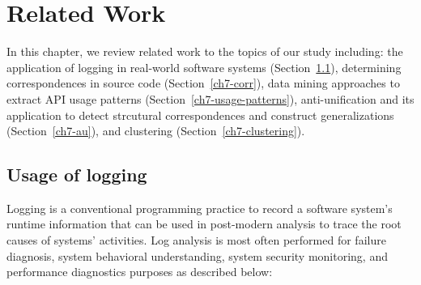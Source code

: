 \chapter{Related Work}  \label{rw}
In this chapter, we review related work to the topics of our study including: the application of logging in real-world software systems (Section~\ref{logging}), determining correspondences in source code (Section~\ref{ch7-corr}), data mining approaches to extract API usage patterns (Section~\ref{ch7-usage-patterns}), anti-unification and its application to detect strcutural correspondences and construct generalizations (Section~\ref{ch7-au}), and clustering (Section~\ref{ch7-clustering}).
\section{Usage of logging}  \label{logging}
Logging is a conventional programming practice to record a software system's runtime information that can be used in post-modern analysis to trace the root causes of systems' activities. Log analysis is most often performed for failure diagnosis, system behavioral understanding, system security monitoring, and performance diagnostics purposes as described below:
